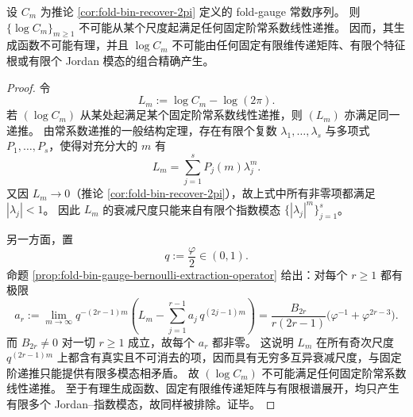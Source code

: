 \begin{theorem}\label{thm:gut-logCm-no-fixed-linear-recurrence}
设 \(C_m\) 为推论 \ref{cor:fold-bin-recover-2pi} 定义的 fold-gauge 常数序列。
则 \(\{\log C_m\}_{m\ge 1}\) 不可能从某个尺度起满足任何固定阶常系数线性递推。
因而，其生成函数不可能有理，并且 \(\log C_m\) 不可能由任何固定有限维传递矩阵、有限个特征根或有限个 Jordan 模态的组合精确产生。
\end{theorem}
\begin{proof}
令
\[
L_m:=\log C_m-\log(2\pi).
\]
若 \((\log C_m)\) 从某处起满足某个固定阶常系数线性递推，则 \((L_m)\) 亦满足同一递推。
由常系数递推的一般结构定理，存在有限个复数 \(\lambda_1,\dots,\lambda_s\) 与多项式 \(P_1,\dots,P_s\)，使得对充分大的 \(m\) 有
\[
L_m=\sum_{j=1}^{s} P_j(m)\lambda_j^m.
\]
又因 \(L_m\to 0\)（推论 \ref{cor:fold-bin-recover-2pi}），故上式中所有非零项都满足 \(|\lambda_j|<1\)。
因此 \(L_m\) 的衰减尺度只能来自有限个指数模态 \(\{|\lambda_j|^m\}_{j=1}^{s}\)。
\par
另一方面，置
\[
q:=\frac{\varphi}{2}\in(0,1).
\]
命题 \ref{prop:fold-bin-gauge-bernoulli-extraction-operator} 给出：对每个 \(r\ge 1\) 都有极限
\[
a_r
:=
\lim_{m\to\infty}
q^{-(2r-1)m}
\left(
L_m-\sum_{j=1}^{r-1} a_j\,q^{(2j-1)m}
\right)
=
\frac{B_{2r}}{r(2r-1)}\bigl(\varphi^{-1}+\varphi^{2r-3}\bigr).
\]
而 \(B_{2r}\neq 0\) 对一切 \(r\ge 1\) 成立，故每个 \(a_r\) 都非零。
这说明 \(L_m\) 在所有奇次尺度 \(q^{(2r-1)m}\) 上都含有真实且不可消去的项，因而具有无穷多互异衰减尺度，与固定阶递推只能提供有限多模态相矛盾。
故 \((\log C_m)\) 不可能满足任何固定阶常系数线性递推。
至于有理生成函数、固定有限维传递矩阵与有限根谱展开，均只产生有限多个 Jordan--指数模态，故同样被排除。证毕。
\end{proof}

